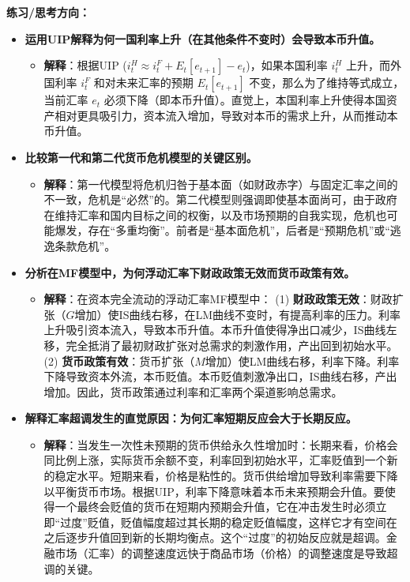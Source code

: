 \documentclass[12pt]{article}
\begin{document}
\textbf{练习/思考方向：}
\begin{itemize}
    \item \textbf{运用UIP解释为何一国利率上升（在其他条件不变时）会导致本币升值。}
    \begin{itemize}
        \item \textbf{解释}：根据UIP ($i_t^H \approx i_t^F + E_t[e_{t+1}] - e_t$)，如果本国利率 $i_t^H$ 上升，而外国利率 $i_t^F$ 和对未来汇率的预期 $E_t[e_{t+1}]$ 不变，那么为了维持等式成立，当前汇率 $e_t$ 必须下降（即本币升值）。直觉上，本国利率上升使得本国资产相对更具吸引力，资本流入增加，导致对本币的需求上升，从而推动本币升值。
    \end{itemize}
    \item \textbf{比较第一代和第二代货币危机模型的关键区别。}
    \begin{itemize}
        \item \textbf{解释}：第一代模型将危机归咎于基本面（如财政赤字）与固定汇率之间的不一致，危机是“必然”的。第二代模型则强调即使基本面尚可，由于政府在维持汇率和国内目标之间的权衡，以及市场预期的自我实现，危机也可能爆发，存在“多重均衡”。前者是“基本面危机”，后者是“预期危机”或“逃逸条款危机”。
    \end{itemize}
    \item \textbf{分析在MF模型中，为何浮动汇率下财政政策无效而货币政策有效。}
    \begin{itemize}
        \item \textbf{解释}：在资本完全流动的浮动汇率MF模型中： (1) \textbf{财政政策无效}：财政扩张（$G$增加）使IS曲线右移，在LM曲线不变时，有提高利率的压力。利率上升吸引资本流入，导致本币升值。本币升值使得净出口减少，IS曲线左移，完全抵消了最初财政扩张对总需求的刺激作用，产出回到初始水平。 (2) \textbf{货币政策有效}：货币扩张（$M$增加）使LM曲线右移，利率下降。利率下降导致资本外流，本币贬值。本币贬值刺激净出口，IS曲线右移，产出增加。因此，货币政策通过利率和汇率两个渠道影响总需求。
    \end{itemize}
    \item \textbf{解释汇率超调发生的直觉原因：为何汇率短期反应会大于长期反应。}
    \begin{itemize}
        \item \textbf{解释}：当发生一次性未预期的货币供给永久性增加时：长期来看，价格会同比例上涨，实际货币余额不变，利率回到初始水平，汇率贬值到一个新的稳定水平。短期来看，价格是粘性的。货币供给增加导致利率需要下降以平衡货币市场。根据UIP，利率下降意味着本币未来预期会升值。要使得一个最终会贬值的货币在短期内预期会升值，它在冲击发生时必须立即“过度”贬值，贬值幅度超过其长期的稳定贬值幅度，这样它才有空间在之后逐步升值回到新的长期均衡点。这个“过度”的初始反应就是超调。金融市场（汇率）的调整速度远快于商品市场（价格）的调整速度是导致超调的关键。
    \end{itemize}
\end{itemize}
\end{document}

